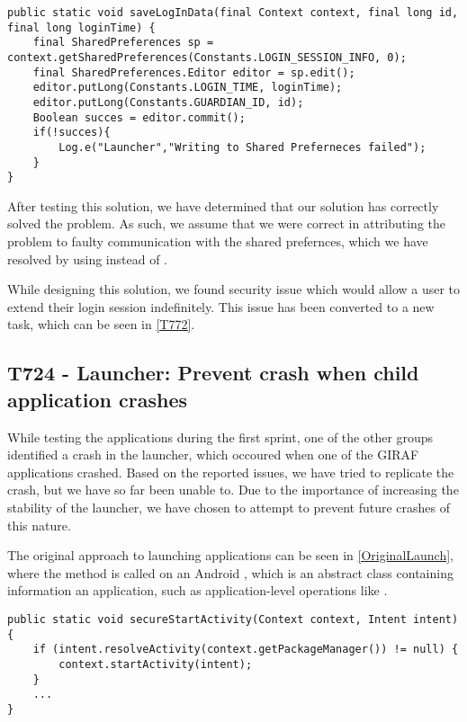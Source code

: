 \begin{minipage}[H]{\linewidth}
\begin{lstlisting}[caption = Our solution to saving login session, label
=SolutionSessionSaving ]
public static void saveLogInData(final Context context, final long id, final long loginTime) {
    final SharedPreferences sp = context.getSharedPreferences(Constants.LOGIN_SESSION_INFO, 0);
    final SharedPreferences.Editor editor = sp.edit();
    editor.putLong(Constants.LOGIN_TIME, loginTime);
    editor.putLong(Constants.GUARDIAN_ID, id);
    Boolean succes = editor.commit();
    if(!succes){
    	Log.e("Launcher","Writing to Shared Preferneces failed");
	}
} 
\end{lstlisting} 
\end{minipage}

After testing this solution, we have determined that our solution has correctly
solved the problem. As such, we assume that we were correct in attributing the
problem to faulty communication with the shared prefernces, which we have
resolved by using  instead of .\nl

While designing this solution, we found security issue which would allow a user
to extend their login session indefinitely. This issue has been converted to a
new task, which can be seen in \autoref{T772}.

\subsection{T724 - Launcher: Prevent crash when child application crashes}
While testing the applications during the first sprint, one of the other groups
identified a crash in the launcher, which occoured when one of the GIRAF
applications crashed. Based on the reported issues, we have tried to
replicate the crash, but we have so far been unable to. Due to the importance of
increasing the stability of the launcher, we have chosen to attempt to prevent
future crashes of this nature.\nl

The original approach to launching applications can be seen in
\autoref{OriginalLaunch}, where the  method is called on an
Android , which is an abstract class containing information an
application, such as application-level operations like
.\nl

\begin{minipage}[H]{\linewidth}
\begin{lstlisting}[caption = Original approach to launching applications., label = OriginalLaunch]
public static void secureStartActivity(Context context, Intent intent) {
	if (intent.resolveActivity(context.getPackageManager()) != null) {	
    	context.startActivity(intent);
	}
	...
}
\end{lstlisting}
\end{minipage}

